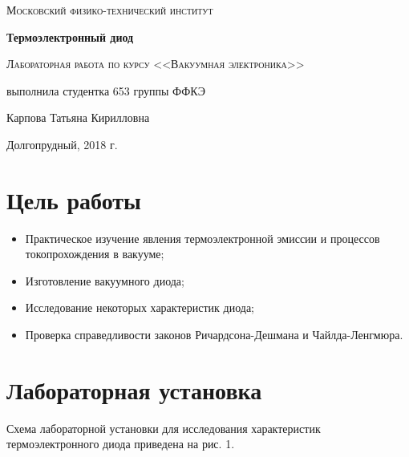 \documentclass[a4paper]{article}
\begin{document}
\begin{titlepage}
	\centering
	\vspace{5cm}
	{\scshape\LARGE Московский физико-технический институт \par}
	\vspace{5cm}

	{\huge\bfseries Термоэлектронный диод \par}
	\vspace{1cm}
	{\scshape\Large Лабораторная работа по курсу <<Вакуумная электроника>>\par}
	\vspace{1cm}
	\vfill
\begin{flushright}
	{\large выполнила студентка 653 группы ФФКЭ}\par
	\vspace{0.3cm}
	{\LARGE Карпова Татьяна Кирилловна} \par

	
\end{flushright}
	

	\vfill

	Долгопрудный, 2018 г.
\end{titlepage}

\section{Цель работы}
\begin{itemize}
    \item Практическое изучение явления термоэлектронной эмиссии и процессов токопрохождения в вакууме;
    \item Изготовление вакуумного диода;
    \item Исследование некоторых характеристик диода;
    \item Проверка справедливости законов Ричардсона-Дешмана и Чайлда-Ленгмюра.
\end{itemize}

\section{Лабораторная установка}
Схема лабораторной установки для исследования характеристик термоэлектронного диода приведена на рис. 1.
\end{document}
